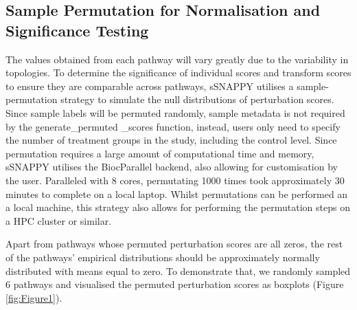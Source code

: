 \documentclass[9pt,a4paper,]{extarticle}
\newenvironment{Shaded}{\begin{snugshade}}{\end{snugshade}}
\newcommand{\AttributeTok}[1]{\textcolor[rgb]{0.77,0.63,0.00}{#1}}
\newcommand{\DecValTok}[1]{\textcolor[rgb]{0.00,0.00,0.81}{#1}}
\newcommand{\FunctionTok}[1]{\textcolor[rgb]{0.00,0.00,0.00}{#1}}
\newcommand{\NormalTok}[1]{#1}
\newcommand{\OtherTok}[1]{\textcolor[rgb]{0.56,0.35,0.01}{#1}}
\newcommand{\SpecialCharTok}[1]{\textcolor[rgb]{0.00,0.00,0.00}{#1}}
\begin{document}
\hypertarget{sample-permutation-for-normalisation-and-significance-testing}{%
\subsection{Sample Permutation for Normalisation and Significance Testing}\label{sample-permutation-for-normalisation-and-significance-testing}}

The values obtained from each pathway will vary greatly due to the variability in topologies.
To determine the significance of individual scores and transform scores to ensure they are comparable across pathways, sSNAPPY utilises a sample-permutation strategy to simulate the null distributions of perturbation scores.
Since sample labels will be permuted randomly, sample metadata is not required by the generate\_permuted \_scores function, instead, users only need to specify the number of treatment groups in the study, including the control level.
Since permutation requires a large amount of computational time and memory, sSNAPPY utilises the BiocParallel backend\citep{BiocParallel}, also allowing for customisation by the user.
Paralleled with 8 cores, permutating 1000 times took approximately 30 minutes to complete on a local laptop.
Whilst permutations can be performed an a local machine, this strategy also allows for performing the permutation steps on a HPC cluster or similar.

\begin{Shaded}
\end{Shaded}

Apart from pathways whose permuted perturbation scores are all zeros, the rest of the pathways' empirical distributions should be approximately normally distributed with means equal to zero.
To demonstrate that, we randomly sampled 6 pathways and visualised the permuted perturbation scores as boxplots (Figure \ref{fig:Figure1}).
\end{document}
